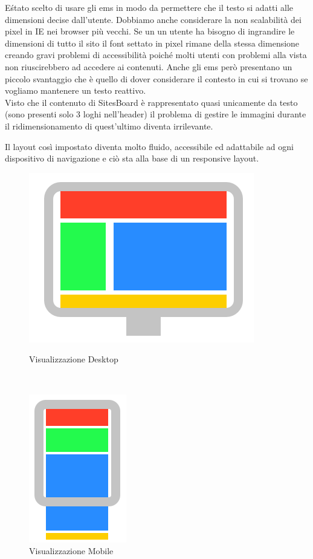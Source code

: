 \documentclass[12pt]{article}
\begin{document}
	E\' stato scelto di usare gli ems in modo da permettere che il testo si adatti alle dimensioni decise dall'utente.
	Dobbiamo anche considerare la non scalabilità dei pixel in IE nei browser più vecchi. Se un un utente ha bisogno di ingrandire le dimensioni di tutto il sito il font settato in pixel rimane della stessa dimensione creando gravi problemi di accessibilità poiché molti utenti con problemi alla vista non riuscirebbero ad accedere ai contenuti.
	Anche gli ems però presentano un piccolo svantaggio che è quello di dover considerare il contesto in cui si trovano se vogliamo mantenere un testo reattivo.\\ Visto che il contenuto di SitesBoard è rappresentato quasi unicamente da testo (sono presenti solo 3 loghi nell'header) il problema di gestire le immagini durante il ridimensionamento di quest'ultimo diventa irrilevante.
	
	Il layout così impostato diventa molto fluido, accessibile ed adattabile ad ogni dispositivo di navigazione e ciò sta alla base di un responsive layout.
	
	\newpage
	
	
	\begin{figure}
 		\begin{minipage}[b]{8.5cm}
  		 \centering
   		\includegraphics[angle=0,scale=.7]{img/layout1.png}
   		\caption{Visualizzazione Desktop}
 		\end{minipage}
 	\ \hspace{2mm} \hspace{3mm} \
		 \begin{minipage}[b]{8.5cm}
  		\centering
   		\includegraphics[angle=0,scale=.7]{img/layout2.png}
   		\caption{Visualizzazione Mobile}
 		\end{minipage}
	\end{figure}
	
\end{document}
